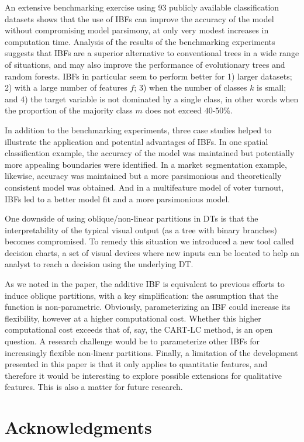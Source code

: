\documentclass[]{elsarticle} %
\begin{document}
An extensive benchmarking exercise using 93 publicly available
classification datasets shows that the use of IBFs can improve the
accuracy of the model without compromising model parsimony, at only very
modest increases in computation time. Analysis of the results of the
benchmarking experiments suggests that IBFs are a superior alternative
to conventional trees in a wide range of situations, and may also
improve the performance of evolutionary trees and random forests. IBFs
in particular seem to perform better for 1) larger datasets; 2) with a
large number of features \(f\); 3) when the number of classes \(k\) is
small; and 4) the target variable is not dominated by a single class, in
other words when the proportion of the majority class \(m\) does not
exceed \(40\)-\(50\)\%.

In addition to the benchmarking experiments, three case studies helped
to illustrate the application and potential advantages of IBFs. In one
spatial classification example, the accuracy of the model was maintained
but potentially more appealing boundaries were identified. In a market
segmentation example, likewise, accuracy was maintained but a more
parsimonious and theoretically consistent model was obtained. And in a
multifeature model of voter turnout, IBFs led to a better model fit and
a more parsimonious model.

One downside of using oblique/non-linear partitions in DTs is that the
interpretability of the typical visual output (as a tree with binary
branches) becomes compromised. To remedy this situation we introduced a
new tool called decision charts, a set of visual devices where new
inputs can be located to help an analyst to reach a decision using the
underlying DT.

As we noted in the paper, the additive IBF is equivalent to previous
efforts to induce oblique partitions, with a key simplification: the
assumption that the function is non-parametric. Obviously,
parameterizing an IBF could increase its flexibility, however at a
higher computational cost. Whether this higher computational cost
exceeds that of, say, the CART-LC method, is an open question. A
research challenge would be to parameterize other IBFs for increasingly
flexible non-linear partitions. Finally, a limitation of the development
presented in this paper is that it only applies to quantitatie features,
and therefore it would be interesting to explore possible extensions for
qualitative features. This is also a matter for future research.

\section{Acknowledgments}\label{acknowledgments}
\end{document}
